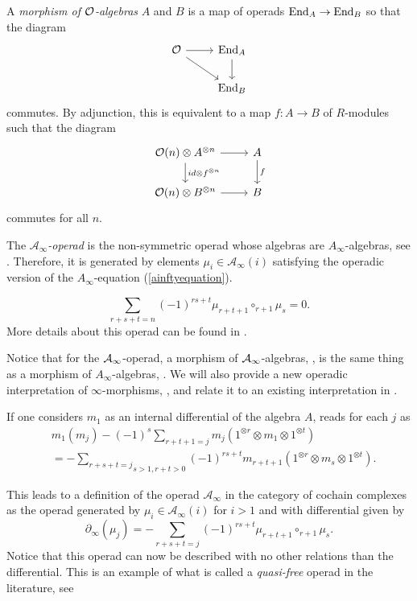 \documentclass[Thesis.tex]{subfiles}
\begin{document}
\begin{defin}\label{algebramorphism}
A \emph{morphism of ${\mathcal O}$-algebras} $A$ and $B$ is a map of operads $\operatorname{End}_A\to\operatorname{End}_B$ so that the diagram
\[
\begin{tikzcd}
\OO \arrow[r]\arrow[dr] & \End_A\arrow[d]\\
& \End_B
\end{tikzcd}
\]
commutes. By adjunction, this is equivalent to a map $f:A\to B$ of $R$-modules such that the diagram
\[
\begin{tikzcd}
\OO(n)\otimes A^{\otimes n} \arrow[r]\arrow[d, "id\otimes f^{\otimes n}"] & A\arrow[d, "f"]\\
 \OO(n)\otimes B^{\otimes n}\arrow[r] & B
\end{tikzcd}
\]
commutes for all $n$.
\end{defin}

\begin{defin}
The \emph{$\mathcal{A}_\infty$-operad} is the non-symmetric operad whose algebras are $A_\infty$-algebras, see . Therefore, it is generated by elements $\mu_i\in\mathcal{A}_\infty(i)$ satisfying the operadic version of the $A_\infty$-equation (\ref{ainftyequation}).

\begin{equation}\label{operadicainftyequation}
\sum_{r+s+t=n}(-1)^{rs+t}\mu_{r+t+1}\circ_{r+1}\mu_s=0.
\end{equation}
More details about this operad can be found in \cite[Chapter 9]{lodayvallette}.
\end{defin}

Notice that for the $\mathcal{A}_\infty$-operad, a morphism of $\mathcal{A}_\infty$-algebras, , is the same thing as a morphism of $A_\infty$-algebras, . We will also provide a new operadic interpretation of $\infty$-morphisms, , and relate it to an existing interpretation in . 

\begin{remark}\label{internal}
If one considers $m_1$ as an internal differential of the algebra $A$,  reads for each $j$ as
\begin{align*}
&m_1(m_j) -(-1)^s \sum _{r+t+1 = j}m_j(1^{\otimes r}\otimes m_1\otimes 1^{\otimes t})\\
&=-\underset{s>1, r+t >0}{\sum_{r+s+t=j}}(-1)^{rs+t}m_{r+t+1}(1^{\otimes r}\otimes m_s\otimes 1^{\otimes t}).
\end{align*}

This leads to a definition of the operad $\mathcal{A}_\infty$ in the category of cochain complexes as the operad generated by $\mu_i\in\mathcal{A}_\infty(i)$ for $i>1$ and with differential given by
\[
\partial_\infty(\mu_j)= -{\sum_{r+s+t=j}}(-1)^{rs+t}\mu_{r+t+1}\circ_{r+1} \mu_s.
\]
Notice that this operad can now be described with no other relations than the differential. This is an example of what is called a \emph{quasi-free} operad in the literature, see \cite[\S 6.3.3]{lodayvallette}
\end{remark}
\end{document}
